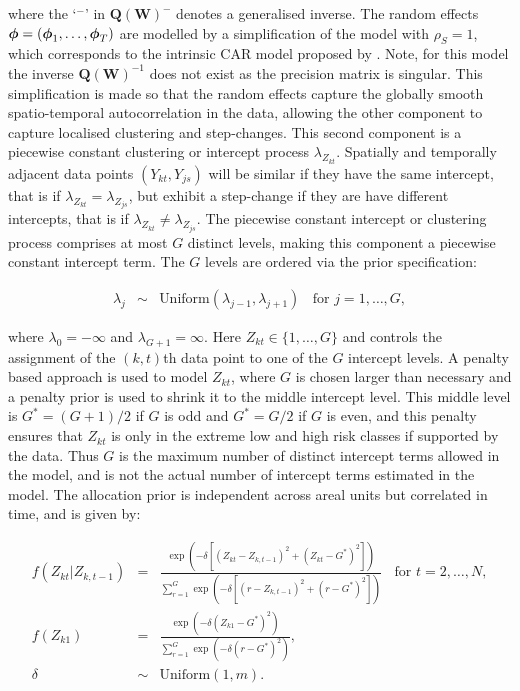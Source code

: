\documentclass[article, nojss]{jss}
\newcommand{\bd}[1]{\ensuremath{\mbox{\boldmath $#1$}}}
\begin{document}
where the `$^{-}$' in $\mathbf{Q}(\mathbf{W})^{-}$ denotes a generalised inverse. The random effects $\bd{\phi}=(\bd{\phi}_{1},\ldots,\bd{\phi}_{T})$ are modelled by a simplification of the  model with $\rho_S=1$, which corresponds to the intrinsic CAR model proposed by \cite{besag1991}. Note, for this model the inverse $\mathbf{Q}(\mathbf{W})^{-1}$ does not exist as the precision matrix is singular. This simplification is made so that the random effects capture the globally smooth spatio-temporal autocorrelation in the data, allowing the other component to capture localised clustering and step-changes. This second component is a piecewise constant clustering or intercept process $\lambda_{Z_{kt}}$. Spatially and  temporally adjacent data points $(Y_{kt}, Y_{js})$ will be similar if they have the same intercept, that is if $\lambda_{Z_{kt}}=\lambda_{Z_{js}}$, but exhibit a step-change if they are have different intercepts, that is if $\lambda_{Z_{kt}}\neq\lambda_{Z_{js}}$. The piecewise constant intercept or clustering process  comprises at most $G$ distinct levels, making this component a piecewise constant intercept term. The $G$ levels are ordered via the prior specification:

\begin{eqnarray}
\lambda_{j}&\sim&\mbox{Uniform}(\lambda_{j-1},\lambda_{j+1})~~~~\mbox{for }j=1,\dots,G,\label{carcluster2}
\end{eqnarray}

where $\lambda_{0}=-\infty$ and  $\lambda_{G+1}=\infty$. Here $Z_{kt}\in\{1,\ldots,G\}$ and controls the assignment of the $(k,t)$th data point to one of the $G$ intercept levels. A penalty based approach is used to model $Z_{kt}$, where $G$ is chosen larger than necessary and a penalty prior is used  to shrink it to the middle intercept level.  This middle level is $G^{*}=(G+1)/2$ if $G$ is odd and $G^{*}=G/2$ if $G$ is even, and this penalty ensures that $Z_{kt}$ is only in the extreme low and high risk classes if supported by the data. Thus $G$ is the maximum number of distinct intercept terms allowed in the model, and is not the actual number of intercept terms estimated in the model. The allocation prior is independent across areal units but correlated in time, and is given by:


\begin{eqnarray}
f(Z_{kt}|Z_{k,t-1})&=&\frac{\exp(-\delta[(Z_{kt}-Z_{k,t-1})^{2} +(Z_{kt}-G^{*})^{2}])}{\sum_{r=1}^{G}\exp(-\delta[(r-Z_{k,t-1})^{2}+(r-G^{*})^{2}])}~~~~\mbox{for } t=2,\ldots,N,\label{carcluster3}\\
f(Z_{k1})&=&\frac{\exp(-\delta(Z_{k1}-G^{*})^{2})}{\sum_{r=1}^{G}\exp(-\delta(r-G^{*})^{2})},\nonumber\\
\delta&\sim&\mbox{Uniform}(1,m).\nonumber
\end{eqnarray}
\end{document}
